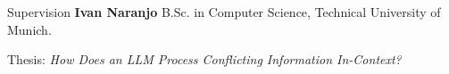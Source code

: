 
\begin{rubric}{Supervision}
	\entry*[2024 -- 2025]
	\textbf{Ivan Naranjo} B.Sc. in Computer Science, Technical University of Munich.\par
	\par Thesis: \emph{How Does an LLM Process Conflicting Information In-Context?}
\end{rubric}